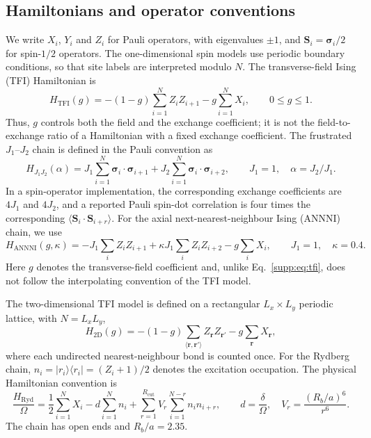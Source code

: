 \documentclass[11pt,a4paper]{article}
\newcommand{\TBD}[1]{\textcolor{red!70!black}{\textsf{[TBD: #1]}}}
\newcommand{\pauli}{\boldsymbol{\sigma}}
\newcommand{\subhead}[1]{\subsection*{#1}}
\begin{document}
\subhead{Hamiltonians and operator conventions}
We write $X_i$, $Y_i$ and $Z_i$ for Pauli operators, with eigenvalues $\pm1$,
and $\mathbf{S}_i=\pauli_i/2$ for spin-$1/2$ operators. The one-dimensional
spin models use periodic boundary conditions, so that site labels are interpreted
modulo $N$. The transverse-field Ising (TFI) Hamiltonian is
\begin{equation}
H_{\mathrm{TFI}}(g)=-(1-g)\sum_{i=1}^{N}Z_iZ_{i+1}
                    -g\sum_{i=1}^{N}X_i,
\qquad 0\leq g\leq1.
\label{supp:eq:tfi}
\end{equation}
Thus, $g$ controls both the field and the exchange coefficient; it is not the
field-to-exchange ratio of a Hamiltonian with a fixed exchange coefficient.
The frustrated $J_1$--$J_2$ chain is defined in the Pauli convention as
\begin{equation}
H_{J_1J_2}(\alpha)=J_1\sum_{i=1}^{N}\pauli_i\cdot\pauli_{i+1}
                 +J_2\sum_{i=1}^{N}\pauli_i\cdot\pauli_{i+2},
\qquad J_1=1,\quad \alpha=J_2/J_1.
\label{supp:eq:j1j2}
\end{equation}
In a spin-operator implementation, the corresponding exchange coefficients are
$4J_1$ and $4J_2$, and a reported Pauli spin-dot correlation is four times the
corresponding $\langle\mathbf{S}_i\cdot\mathbf{S}_{i+r}\rangle$.
For the axial next-nearest-neighbour Ising (ANNNI) chain, we use
\begin{equation}
H_{\mathrm{ANNNI}}(g,\kappa)
=-J_1\sum_i Z_iZ_{i+1}+\kappa J_1\sum_i Z_iZ_{i+2}-g\sum_iX_i,
\qquad J_1=1,\quad\kappa=0.4.
\label{supp:eq:annni}
\end{equation}
Here \(g\) denotes the transverse-field coefficient and, unlike Eq.~\ref{supp:eq:tfi}, does not follow the interpolating convention of the TFI model.

The two-dimensional TFI model is defined on a rectangular $L_x\times L_y$
periodic lattice, with $N=L_xL_y$,
\begin{equation}
H_{\mathrm{2D}}(g)=-(1-g)\sum_{\langle\mathbf{r},\mathbf{r}'\rangle}
Z_{\mathbf{r}}Z_{\mathbf{r}'}-g\sum_{\mathbf{r}}X_{\mathbf{r}},
\label{supp:eq:tfi2d}
\end{equation}
where each undirected nearest-neighbour bond is counted once.
For the Rydberg chain, $n_i=|r_i\rangle\langle r_i|=(Z_i+1)/2$ denotes the
excitation occupation. The physical Hamiltonian convention is
\begin{equation}
\frac{H_{\mathrm{Ryd}}}{\Omega}
=\frac12\sum_{i=1}^{N}X_i-d\sum_{i=1}^{N}n_i
+\sum_{r=1}^{R_{\mathrm{cut}}}V_r\sum_{i=1}^{N-r}n_in_{i+r},
\qquad d=\frac{\delta}{\Omega},\quad
V_r=\frac{(R_b/a)^6}{r^6}.
\label{supp:eq:ryd}
\end{equation}
The chain has open ends and $R_b/a=2.35$. 
\end{document}

